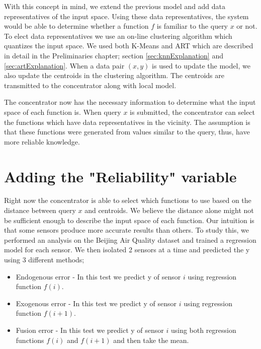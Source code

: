 \documentclass{mproj}
\begin{document}
With this concept in mind, we extend the previous model and add data representatives of the input space. Using these data representatives, the system would be able to determine whether a function $f$ is familiar to the query $x$ or not. To elect data representatives we use an on-line clustering algorithm which quantizes the input space. We used both K-Means and ART which are described in detail in the Preliminaries chapter; section \ref{sec:knnExplanation} and \ref{sec:artExplanation}. When a data pair $(x,y)$ is used to update the model, we also update the centroids in the clustering algorithm. The centroids are transmitted to the concentrator along with local model.

The concentrator now has the necessary information to determine what the input space of each function is. When query $x$ is submitted, the concentrator can select the functions which have data representatives in the vicinity. The assumption is that these functions were generated from values similar to the query, thus, have more reliable knowledge.

\section{Adding the "Reliability" variable}
Right now the concentrator is able to select which functions to use based on the distance between query $x$ and centroids. We believe the distance alone might not be sufficient enough to describe the input space of each function. Our intuition is that some sensors produce more accurate results than others. To study this, we performed an analysis on the Beijing Air Quality dataset \cite{air-quality-inference-meets-big-data} and trained a regression model for each sensor. We then isolated 2 sensors at a time and predicted the y using 3 different methods; 

\begin{itemize}  
\item Endogenous error - In this test we predict y of sensor $i$ using regression function $f(i)$.
\item Exogenous error - In this test we predict y of sensor $i$ using regression function $f(i+1)$.
\item Fusion error - In this test we predict y of sensor $i$ using both regression functions $f(i)$ and $f(i+1)$ and then take the mean.
\end{itemize}
\end{document}
